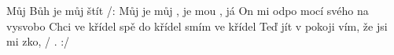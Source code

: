 \begin{TEXT}{Můj Bůh je můj štít}
\SLOKA /: Můj   je můj  , je mou  , já   \NL
On mi odpo mocí svého  na vysvobo\NL
Chci   ve   křídel   \NL 
spě do   křídel  \NL
smím   ve   křídel  \NL
Teď   jít v pokoji   vím, že jsi mi  zko,  / . :/
\end{TEXT}
